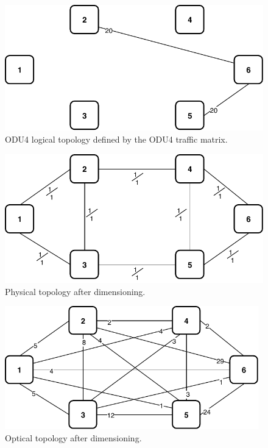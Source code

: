 \begin{figure}[h!]
\centering
\includegraphics[width=12cm]{sdf/ilp/transparent_survivability/figures/logical_topology_ODU4_high}
\caption{ODU4 logical topology defined by the ODU4 traffic matrix.}
\label{logical2_ODU4_high}
\end{figure}

\begin{figure}[h!]
\centering
\includegraphics[width=12cm]{sdf/ilp/transparent_survivability/figures/physical_topology}
\caption{Physical topology after dimensioning.}
\label{physical2_high}
\end{figure}

\newpage
\begin{figure}[h!]
\centering
\includegraphics[width=11cm]{sdf/ilp/transparent_survivability/figures/optical_topology_high}
\caption{Optical topology after dimensioning.}
\label{optical2_high}
\end{figure}

